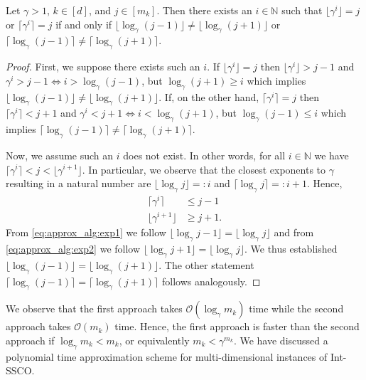\begin{lemma}
Let $\gamma > 1$, $k \in [d]$, and $j \in [m_k]$. Then there exists an $i \in \mathbb{N}$ such that $\lfloor\gamma^i\rfloor = j$ or $\lceil\gamma^i\rceil = j$ if and only if $\lfloor\log_{\gamma} (j-1)\rfloor \neq \lfloor\log_{\gamma} (j+1)\rfloor$ or $\lceil\log_{\gamma} (j-1)\rceil \neq \lceil\log_{\gamma} (j+1)\rceil$.
\end{lemma}
\begin{proof}
First, we suppose there exists such an $i$. If $\lfloor\gamma^i\rfloor = j$ then $\lfloor\gamma^i\rfloor > j-1$ and $\gamma^i > j-1 \iff i > \log_{\gamma} (j-1)$, but $\log_{\gamma} (j+1) \geq i$ which implies $\lfloor\log_{\gamma} (j-1)\rfloor \neq \lfloor\log_{\gamma} (j+1)\rfloor$. If, on the other hand, $\lceil\gamma^i\rceil = j$ then $\lceil\gamma^i\rceil < j+1$ and $\gamma^i < j+1 \iff i < \log_{\gamma} (j+1)$, but $\log_{\gamma} (j-1) \leq i$ which implies $\lceil\log_{\gamma} (j-1)\rceil \neq \lceil\log_{\gamma} (j+1)\rceil$.

Now, we assume such an $i$ does not exist. In other words, for all $i \in \mathbb{N}$ we have $\lceil\gamma^i\rceil < j < \lfloor\gamma^{i+1}\rfloor$. In particular, we observe that the closest exponents to $\gamma$ resulting in a natural number are $\lfloor\log_{\gamma} j \rfloor =: i$ and $\lceil\log_{\gamma} j \rceil =: i+1$. Hence, \begin{align}
    \lceil\gamma^i \rceil       &\leq j-1 \label{eq:approx_alg:exp1} \\
    \lfloor\gamma^{i+1} \rfloor &\geq j+1. \label{eq:approx_alg:exp2}
\end{align} From \autoref{eq:approx_alg:exp1} we follow $\lfloor\log_{\gamma} j-1 \rfloor = \lfloor\log_{\gamma} j \rfloor$ and from \autoref{eq:approx_alg:exp2} we follow $\lfloor\log_{\gamma} j+1 \rfloor = \lfloor\log_{\gamma} j \rfloor$. We thus established $\lfloor\log_{\gamma} (j-1)\rfloor = \lfloor\log_{\gamma} (j+1)\rfloor$. The other statement $\lceil\log_{\gamma} (j-1)\rceil = \lceil\log_{\gamma} (j+1)\rceil$ follows analogously.
\end{proof}

We observe that the first approach takes $\mathcal{O}(\log_{\gamma} m_k)$ time while the second approach takes $\mathcal{O}(m_k)$ time. Hence, the first approach is faster than the second approach if $\log_{\gamma} m_k < m_k$, or equivalently $m_k < \gamma^{m_k}$. We have discussed a polynomial time approximation scheme for multi-dimensional instances of Int-SSCO.
